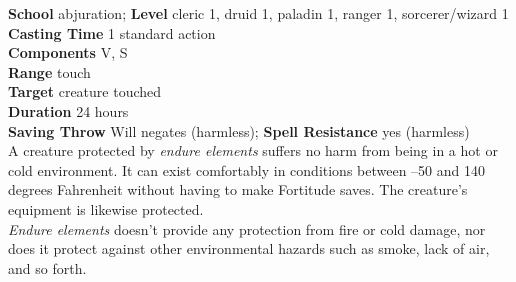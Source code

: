 \textbf{School} abjuration; \textbf{Level} cleric 1, druid 1, paladin 1, ranger 1, sorcerer/wizard 1\\
\textbf{Casting Time} 1 standard action\\
\textbf{Components} V, S\\
\textbf{Range} touch\\
\textbf{Target} creature touched\\
\textbf{Duration} 24 hours\\
\textbf{Saving Throw }Will negates (harmless); \textbf{Spell Resistance} yes (harmless)\\
A creature protected by \textit{endure elements }suffers no harm from being in a hot or cold environment. It can exist comfortably in conditions between --50 and 140 degrees Fahrenheit without having to make Fortitude saves. The creature's equipment is likewise protected.\\
\textit{Endure elements }doesn't provide any protection from fire or cold damage, nor does it protect against other environmental hazards such as smoke, lack of air, and so forth.\\
